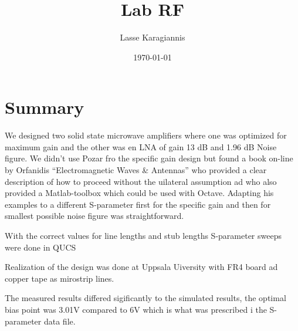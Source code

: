 \documentclass{article}
\title{Lab RF\\}
\author{Lasse Karagiannis}
\date{\today} %
\newcommand\mtotex[2]{\immediate\write18{m4 #2.m4 | dpic -#1 > #2.tex}}
\begin{document}
\begin{titlepage}
\maketitle
\end{titlepage}
\tableofcontents
\vfill\null
\newpage

%



%

\section{Summary}
We designed two solid state microwave amplifiers where one was optimized for maximum gain
and the other was en LNA of gain 13 dB and 1.96 dB Noise figure.
We didn't use Pozar fro the specific gain design but found a book on-line by Orfanidis
``Electromagnetic Waves \& Antennas'' who provided a clear description of how to
proceed without the uilateral assumption ad who also provided a Matlab-toolbox which
could be used with Octave. 
Adapting his examples to a different S-parameter first for the specific gain and
then for smallest possible noise figure was straightforward.

With the correct values for line lengths and stub lengths S-parameter sweeps
were done in QUCS

Realization of the design was done at Uppsala Uiversity with FR4 board ad copper tape
as mirostrip lines.

The measured results differed sigificantly to the simulated results, the optimal bias point
was 3.01V compared to 6V which is what was prescribed i the S-parameter data file.
\end{document}
